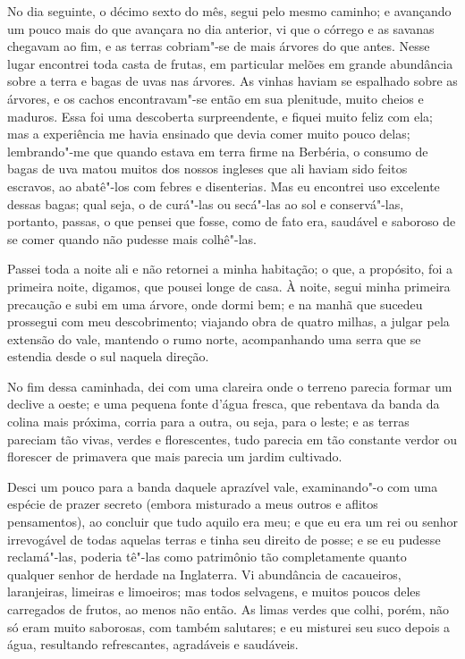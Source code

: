 No dia seguinte, o décimo sexto do mês, segui pelo mesmo caminho; e
avançando um pouco mais do que avançara no dia anterior, vi que o
córrego e as savanas chegavam ao fim, e as terras cobriam"-se de mais
árvores do que antes. Nesse lugar encontrei toda casta de frutas, em
particular melões em grande abundância sobre a terra e bagas de uvas nas
árvores. As vinhas haviam se espalhado sobre as árvores, e os cachos
encontravam"-se então em sua plenitude, muito cheios e maduros. Essa foi
uma descoberta surpreendente, e fiquei muito feliz com ela; mas a
experiência me havia ensinado que devia comer muito pouco delas;
lembrando"-me que quando estava em terra firme na Berbéria, o consumo de
bagas de uva matou muitos dos nossos ingleses que ali haviam sido feitos
escravos, ao abatê"-los com febres e disenterias. Mas eu encontrei uso
excelente dessas bagas; qual seja, o de curá"-las ou secá"-las ao sol e
conservá"-las, portanto, passas, o que pensei que fosse, como de fato
era, saudável e saboroso de se comer quando não pudesse mais colhê"-las.

Passei toda a noite ali e não retornei a minha habitação; o que, a
propósito, foi a primeira noite, digamos, que pousei longe de casa. À
noite, segui minha primeira precaução e subi em uma árvore, onde dormi
bem; e na manhã que sucedeu prossegui com meu descobrimento; viajando
obra de quatro milhas, a julgar pela extensão do vale, mantendo o rumo
norte, acompanhando uma serra que se estendia desde o sul naquela
direção.

No fim dessa caminhada, dei com uma clareira onde o terreno parecia
formar um declive a oeste; e uma pequena fonte d'água fresca, que
rebentava da banda da colina mais próxima, corria para a outra, ou seja,
para o leste; e as terras pareciam tão vivas, verdes e florescentes,
tudo parecia em tão constante verdor ou florescer de primavera que mais
parecia um jardim cultivado.

Desci um pouco para a banda daquele aprazível vale, examinando"-o com uma
espécie de prazer secreto (embora misturado a meus outros e aflitos
pensamentos), ao concluir que tudo aquilo era meu; e que eu era um rei
ou senhor irrevogável de todas aquelas terras e tinha seu direito de
posse; e se eu pudesse reclamá"-las, poderia tê"-las como patrimônio tão
completamente quanto qualquer senhor de herdade na Inglaterra. Vi
abundância de cacaueiros, laranjeiras, limeiras e limoeiros; mas todos
selvagens, e muitos poucos deles carregados de frutos, ao menos não
então. As limas verdes que colhi, porém, não só eram muito saborosas,
com também salutares; e eu misturei seu suco depois a água, resultando
refrescantes, agradáveis e saudáveis.

